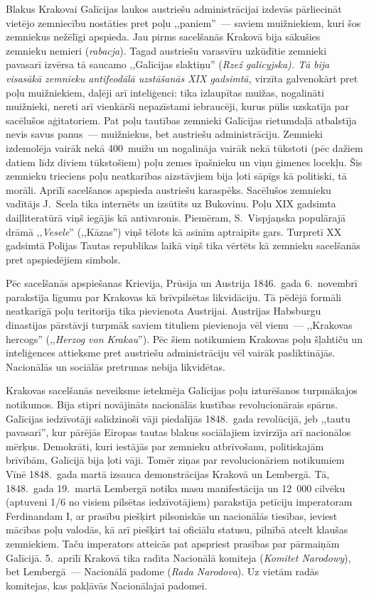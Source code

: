 \documentclass[twoside,a5paper,12pt,fleqn,openany]{extbook}
\newcommand{\pltxti}[1]{\textit{\textpolish{#1}}}
\newcommand{\detxti}[1]{\textit{\textgerman{#1}}}
\begin{document}
Blakus Krakovai Galīcijas laukos austriešu administrācijai izdevās pārliecināt vietējo zemniecību nostāties pret poļu ,,paniem''~--- saviem muižniekiem, kuri šos zemniekus nežēlīgi apspieda. Jau pirms sacelšanās Krakovā bija sākušies zemnieku nemieri (\pltxti{rabacja}). Tagad austriešu varasvīru uzkūdītie zemnieki pavasarī izvērsa tā saucamo ,,Galīcijas slaktiņu'' (\pltxti{Rzeź galicyjska). Tā bija visasākā zemnieku antifeodālā uzstāšanās XIX gadsimtā,} virzīta galvenokārt pret poļu muižniekiem, daļēji arī inteliģenci: tika izlaupītas muižas, nogalināti muižnieki, nereti arī vienkārši nepazīstami iebraucēji, kurus pūlis uzskatīja par sacēlušos aģitatoriem. Pat poļu tautības zemnieki Galīcijas rietumdaļā atbalstīja nevis savus panus~--- muižniekus, bet austriešu administrāciju. Zemnieki izdemolēja vairāk nekā 400~muižu un nogalināja vairāk nekā tūkstoti (pēc dažiem datiem līdz diviem tūkstošiem) poļu zemes īpašnieku un viņu ģimenes locekļu. Šis zemnieku trieciens poļu neatkarības aizstāvjiem bija ļoti sāpīgs kā politiski, tā morāli. Aprīlī sacelšanos apspieda austriešu karaspēks. Sacēlušos zemnieku vadītājs J.~Scela tika internēts un izsūtīts uz Bukovinu. Poļu XIX gadsimta daiļliteratūrā viņš iegājis kā antivaronis. Piemēram, S.~Vispjaņska populārajā drāmā ,,\pltxti{Vesele}'' (,,Kāzas'') viņš tēlots kā asinīm aptraipīts gars. Turpretī XX gadsimtā Polijas Tautas republikas laikā viņš tika vērtēts kā zemnieku sacelšanās pret apspiedējiem simbols.

Pēc sacelšanās apspiešanas Krievija, Prūsija un Austrija 1846.~gada 6.~novembrī parakstīja līgumu par Krakovas kā brīvpilsētas likvidāciju. Tā pēdējā formāli neatkarīgā poļu teritorija tika pievienota Austrijai. Austrijas Habsburgu dinastijas pārstāvji turpmāk saviem tituliem pievienoja vēl vienu~--- ,,Krakovas hercogs'' (,,\detxti{Herzog von Krakau}''). Pēc šiem notikumiem Krakovas poļu šļahtiču un inteliģences attieksme pret austriešu administrāciju vēl vairāk pasliktinājās. Nacionālās un sociālās pretrunas nebija likvidētas.

Krakovas sacelšanās neveiksme ietekmēja Galīcijas poļu izturēšanos turpmākajos notikumos. Bija stipri novājināts nacionālās kustības revolucionārais spārns. Galīcijas iedzīvotāji salīdzinoši vāji piedalījās 1848.~gada revolūcijā, jeb ,,tautu pavasarī'', kur pārējās Eiropas tautas blakus sociālajiem izvirzīja arī nacionālos mērķus. Demokrāti, kuri iestājās par zemnieku atbrīvošanu, politiskajām brīvībām, Galīcijā bija ļoti vāji. Tomēr ziņas par revolucionāriem notikumiem Vīnē 1848.~gada martā izsauca demonstrācijas Krakovā un Lembergā. Tā, 1848.~gada 19.~martā Lembergā notika masu manifestācija un 12~000 cilvēku (aptuveni 1/6 no visiem pilsētas iedzīvotājiem) parakstīja petīciju imperatoram Ferdinandam I, ar prasību piešķirt pilsoniskās un nacionālās tiesības, ieviest mācības poļu valodās, kā arī piešķirt tai oficiālu statusu, pilnībā atcelt klaušas zemniekiem. Taču imperators atteicās pat apspriest prasības par pārmaiņām Galīcijā. 5.~aprīlī Krakovā tika radīta Nacionālā komiteja (\pltxti{Komitet Narodowy}), bet Lembergā~--- Nacionālā padome (\pltxti{Rada Narodova}). Uz vietām radās komitejas, kas pakļāvās Nacionālajai padomei.
\end{document}
